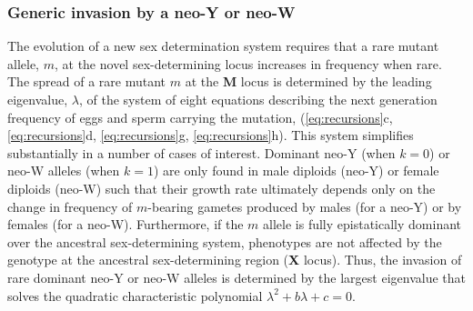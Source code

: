 \documentclass[12pt]{article}
\begin{document}

\subsubsection*{Generic invasion by a neo-Y or neo-W}

The evolution of a new sex determination system requires that a rare mutant allele, $m$, at the novel sex-determining locus  increases in frequency when rare. 
The spread of a rare mutant $m$ at the \textbf{M} locus is determined by the leading eigenvalue, $\lambda$, of the system of eight equations describing the next generation frequency of eggs and sperm carrying the mutation, (\ref{eq:recursions}c, \ref{eq:recursions}d, \ref{eq:recursions}g, \ref{eq:recursions}h). %
This system simplifies substantially in a number of cases of interest. 
Dominant neo-Y (when $k=0$) or neo-W alleles (when $k=1$) are only found in male diploids (neo-Y) or female diploids (neo-W) such that their growth rate ultimately depends only on the change in frequency of $m$-bearing gametes produced by males (for a neo-Y) or by females (for a neo-W). 
Furthermore, if the $m$ allele is fully epistatically dominant over the ancestral sex-determining system, phenotypes are not affected by the genotype at the ancestral sex-determining region (\textbf{X} locus). 
Thus, the invasion of rare dominant neo-Y or neo-W alleles is determined by the largest eigenvalue that solves the quadratic characteristic polynomial
$\lambda^2+ b \lambda + c =0$.
%
\end{document}
